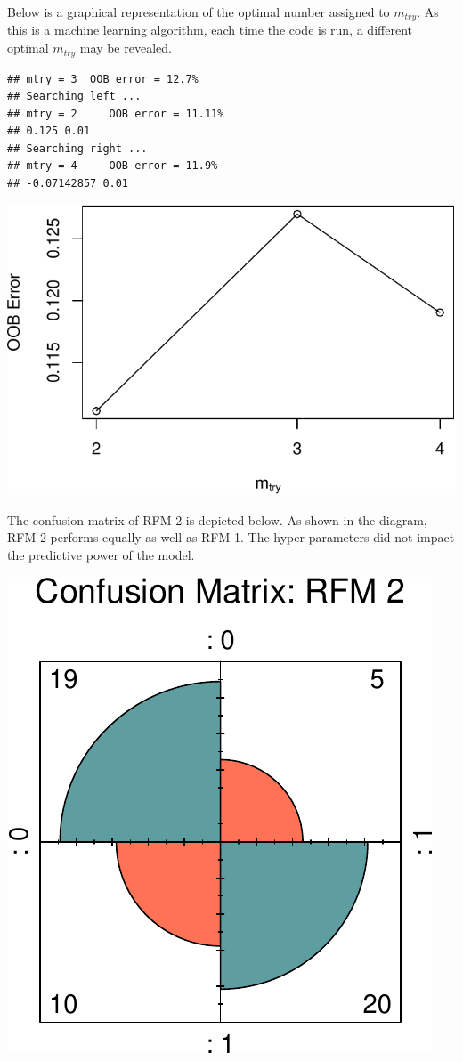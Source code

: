 \documentclass[11pt,preprint, authoryear]{elsarticle}
\numberwithin{equation}{section}
\numberwithin{figure}{section}
\numberwithin{table}{section}
\begin{document}
Below is a graphical representation of the optimal number assigned to
\(m_{try}\). As this is a machine learning algorithm, each time the code
is run, a different optimal \(m_{try}\) may be revealed.

\begin{verbatim}
## mtry = 3  OOB error = 12.7% 
## Searching left ...
## mtry = 2     OOB error = 11.11% 
## 0.125 0.01 
## Searching right ...
## mtry = 4     OOB error = 11.9% 
## -0.07142857 0.01
\end{verbatim}

\begin{center}\includegraphics{ML_project_files/figure-latex/unnamed-chunk-9-1} \end{center}

The confusion matrix of RFM 2 is depicted below. As shown in the
diagram, RFM 2 performs equally as well as RFM 1. The hyper parameters
did not impact the predictive power of the model.

\begin{center}\includegraphics{ML_project_files/figure-latex/unnamed-chunk-11-1} \end{center}
\end{document}
